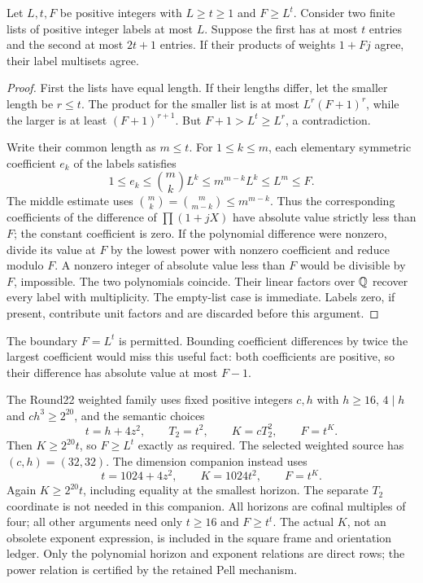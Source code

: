 \begin{lemma}\label{lem:separate}
Let $L,t,F$ be positive integers with $L\ge t\ge1$ and $F\ge L^t$.
Consider two finite lists of positive
integer labels at most $L$. Suppose the first has at most $t$ entries
and the second at most $2t+1$ entries. If their products of weights
$1+Fj$ agree, their label multisets agree.
\end{lemma}
\begin{proof}
First the lists have equal length. If their lengths differ, let the
smaller length be $r\le t$. The product for the smaller list is at most
$L^r(F+1)^r$, while the larger is at least $(F+1)^{r+1}$.
But $F+1>L^t\ge L^r$, a contradiction.

Write their common length as $m\le t$. For $1\le k\le m$, each
elementary symmetric coefficient $e_k$ of the labels satisfies
\[
 1\le e_k\le \binom{m}{k}L^k
       \le m^{m-k}L^k\le L^m\le F.
\]
The middle estimate uses $\binom{m}{k}=\binom{m}{m-k}\le m^{m-k}$.
Thus the corresponding coefficients of the difference of
$\prod(1+jX)$ have absolute value strictly less than $F$; the constant
coefficient is zero. If the polynomial difference were nonzero, divide
its value at $F$ by the lowest power with nonzero coefficient and reduce
modulo $F$. A nonzero integer of absolute value less than $F$ would be
divisible by $F$, impossible. The two polynomials coincide. Their linear
factors over $\mathbb Q$ recover every label with multiplicity. The empty-list
case is immediate. Labels zero, if present, contribute unit factors and
are discarded before this argument.
\end{proof}

The boundary $F=L^t$ is permitted. Bounding coefficient differences by
twice the largest coefficient would miss this useful fact: both coefficients
are positive, so their difference has absolute value at most $F-1$.

The Round22 weighted family uses fixed positive integers $c,h$ with
$h\ge16$, $4\mid h$ and $ch^3\ge2^{20}$, and the semantic choices
\begin{equation}\label{eq:growth}
 t=h+4z^2,\qquad T_2=t^2,\qquad K=cT_2^2,\qquad F=t^K.
\end{equation}
Then $K\ge2^{20}t$, so $F\ge L^t$ exactly as required. The selected
weighted source has $(c,h)=(32,32)$. The dimension companion instead uses
\[
 t=1024+4z^2,\qquad K=1024t^2,\qquad F=t^K.
\]
Again $K\ge2^{20}t$, including equality at the smallest horizon.
The separate $T_2$ coordinate is not needed in this companion. All horizons
are cofinal multiples of four; all other arguments need only $t\ge16$
and $F\ge t^t$. The actual $K$, not an obsolete exponent expression,
is included in the square frame and orientation ledger. Only the polynomial
horizon and exponent relations are direct rows; the power relation is
certified by the retained Pell mechanism.

